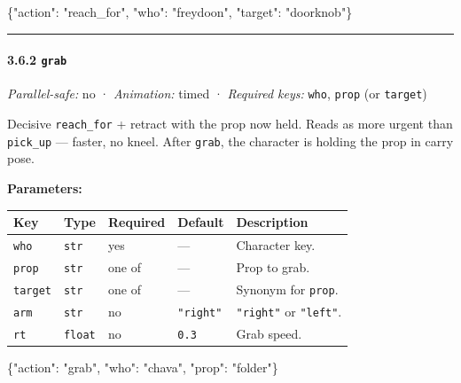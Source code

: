 \documentclass[
  11pt,
]{book}
\newenvironment{Shaded}{}{}
\newcommand{\DataTypeTok}[1]{\textcolor[rgb]{0.56,0.13,0.00}{#1}}
\newcommand{\FunctionTok}[1]{\textcolor[rgb]{0.02,0.16,0.49}{#1}}
\newcommand{\StringTok}[1]{\textcolor[rgb]{0.25,0.44,0.63}{#1}}
\begin{document}
\begin{Shaded}
\begin{Highlighting}[]
\FunctionTok{\{}\DataTypeTok{"action"}\FunctionTok{:} \StringTok{"reach\_for"}\FunctionTok{,} \DataTypeTok{"who"}\FunctionTok{:} \StringTok{"freydoon"}\FunctionTok{,} \DataTypeTok{"target"}\FunctionTok{:} \StringTok{"doorknob"}\FunctionTok{\}}
\end{Highlighting}
\end{Shaded}

\begin{center}\rule{0.5\linewidth}{0.5pt}\end{center}

\paragraph{\texorpdfstring{3.6.2 \texttt{grab}}{3.6.2 grab}}\label{grab}

\emph{Parallel-safe:} no · \emph{Animation:} timed · \emph{Required
keys:} \texttt{who}, \texttt{prop} (or \texttt{target})

Decisive \texttt{reach\_for} + retract with the prop now held. Reads as
more urgent than \texttt{pick\_up} --- faster, no kneel. After
\texttt{grab}, the character is holding the prop in carry pose.

\textbf{Parameters:}

\begin{longtable}[]{@{}lllll@{}}
\toprule\noalign{}
Key & Type & Required & Default & Description \\
\midrule\noalign{}
\endhead
\bottomrule\noalign{}
\endlastfoot
\texttt{who} & \texttt{str} & yes & --- & Character key. \\
\texttt{prop} & \texttt{str} & one of & --- & Prop to grab. \\
\texttt{target} & \texttt{str} & one of & --- & Synonym for
\texttt{prop}. \\
\texttt{arm} & \texttt{str} & no & \texttt{"right"} & \texttt{"right"}
or \texttt{"left"}. \\
\texttt{rt} & \texttt{float} & no & \texttt{0.3} & Grab speed. \\
\end{longtable}

\begin{Shaded}
\begin{Highlighting}[]
\FunctionTok{\{}\DataTypeTok{"action"}\FunctionTok{:} \StringTok{"grab"}\FunctionTok{,} \DataTypeTok{"who"}\FunctionTok{:} \StringTok{"chava"}\FunctionTok{,} \DataTypeTok{"prop"}\FunctionTok{:} \StringTok{"folder"}\FunctionTok{\}}
\end{Highlighting}
\end{Shaded}
\end{document}
